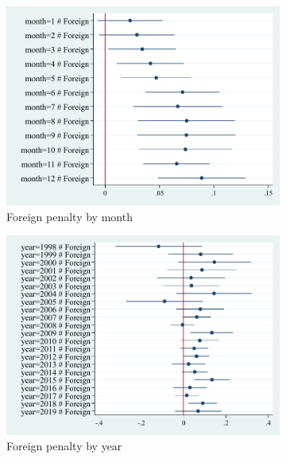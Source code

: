 \documentclass[letterpaper,12pt]{article}
\begin{document}
\begin{landscape}
\begin{figure}[H]
	
	\begin{subfigure}[b]{0.65\textwidth}
		\centering
		\includegraphics[width=1\linewidth]{../output/figures/heterogeneity_by_month.pdf}
		\caption{Foreign penalty by month}
	\end{subfigure}
	\hfill
	\begin{subfigure}[b]{0.65\textwidth}
		\centering
		\includegraphics[width=1\linewidth]{../output/figures/heterogeneity_by_year.pdf}
		\caption{Foreign penalty by year}
	\end{subfigure}
	\hfill
	\begin{subfigure}[b]{0.65\textwidth}
		\centering

\end{subfigure}
\end{figure}
\end{landscape}
\end{document}
